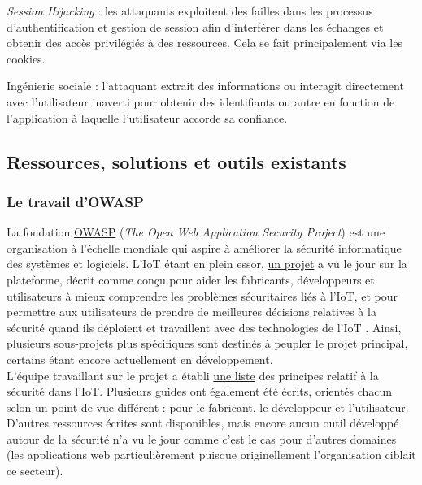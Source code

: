 \documentclass[]{article}
\begin{document}
\par \textit{Session Hijacking} : les attaquants exploitent des failles dans les processus d'authentification et gestion de session afin d'interférer dans les échanges et obtenir des accès privilégiés à des ressources. Cela se fait principalement via les cookies.\\

\par Ingénierie sociale : l'attaquant extrait des informations ou interagit directement avec l'utilisateur inaverti pour obtenir des identifiants ou autre en fonction de l'application à laquelle l'utilisateur accorde sa confiance.

\newpage


\subsection{Ressources, solutions et outils existants}

\subsubsection{Le travail d'OWASP}

La fondation \href{https://www.owasp.org/index.php/Main_Page}{OWASP} (\textit{The Open Web Application Security Project}) est une organisation à l'échelle mondiale qui aspire à améliorer la sécurité informatique des systèmes et logiciels. L'IoT étant en plein essor, \href{https://www.owasp.org/index.php/OWASP_Internet_of_Things_Project}{un projet} a vu le jour sur la plateforme, décrit comme \og conçu pour aider les fabricants, développeurs et utilisateurs à mieux comprendre les problèmes sécuritaires liés à l'IoT, et pour permettre aux utilisateurs de prendre de meilleures décisions relatives à la sécurité quand ils déploient et travaillent avec des technologies de l'IoT \fg .
Ainsi, plusieurs sous-projets plus spécifiques sont destinés à peupler le projet principal, certains étant encore actuellement en développement.\\

L'équipe travaillant sur le projet a établi \href{https://www.owasp.org/index.php/Principles_of_IoT_Security}{une liste} des principes relatif à la sécurité dans l'IoT. Plusieurs guides ont également été écrits, orientés chacun selon un point de vue différent : pour le fabricant, le développeur et l'utilisateur. D'autres ressources écrites sont disponibles, mais encore aucun outil développé autour de la sécurité n'a vu le jour comme c'est le cas pour d'autres domaines (les applications web particulièrement puisque originellement l'organisation ciblait ce secteur).	 
\end{document}
